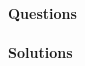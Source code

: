 \documentclass[a4paper,12pt]{report}
\begin{document}
\paragraph{Questions}
\begin{enumerate}
  \foreachproblem{\item\thisproblem}
\end{enumerate}
\paragraph{Solutions}
\showanswers
\onlysolution
\begin{enumerate} 
  \foreachproblem{\item\thisproblem}
\end{enumerate}
\end{document}
